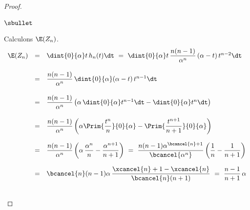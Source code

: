 \documentclass[11pt]{article}%
\begin{document}
\begin{proof}
\begin{noliste}{$\sbullet$}
	
	\item Calculons $\E(Z_n)$.
	\[
	  \begin{array}{rcl}
	    \E(Z_n) & = & \dint{0}{\alpha} t \, h_n(t) \dt \ = \
	    \dint{0}{\alpha} t \, \dfrac{n(n-1)}{\alpha^{n}} \,
	    (\alpha -t) \, t^{n-2} \dt
	    \\[.6cm]
	    & = & \dfrac{n(n-1)}{\alpha^{n}} \, \dint{0}{\alpha}
	    (\alpha -t) \, t^{n-1} \dt
	    \\[.6cm]
	    & = & \dfrac{n(n-1)}{\alpha^n} \left(\alpha \, 
	    \dint{0}{\alpha} t^{n-1} \dt - \dint{0}{\alpha} t^n \dt
	    \right)
	    \\[.6cm]
	    & = & \dfrac{n(n-1)}{\alpha^n} \left(\alpha 
	    \Prim{\dfrac{t^n}{n}}{0}{\alpha} - \Prim{\dfrac{t^{n+1}}
	    {n+1}}{0}{\alpha} \right)
	    \\[.6cm]
	    & = & \dfrac{n(n-1)}{\alpha^n} \left( \alpha \, 
	    \dfrac{\alpha^n}{n} - \dfrac{\alpha^{n+1}}{n+1} \right)
	    \ = \ \dfrac{n(n-1)\alpha^{\bcancel{n}+1}}
	    {\bcancel{\alpha^n}}\left(\dfrac{1}{n} - \dfrac{1}{n+1}
	    \right)
	    \\[.6cm]
	    & = & \bcancel{n}(n-1) \alpha \, \dfrac{\xcancel{n} +1
	    -\xcancel{n}}{\bcancel{n}(n+1)}
	    \ = \ \dfrac{n-1}{n+1} \, \alpha
	  \end{array}
	\]
      \end{noliste}
      
      ~\\[-1.4cm]
    \end{proof}
  
\end{document}
